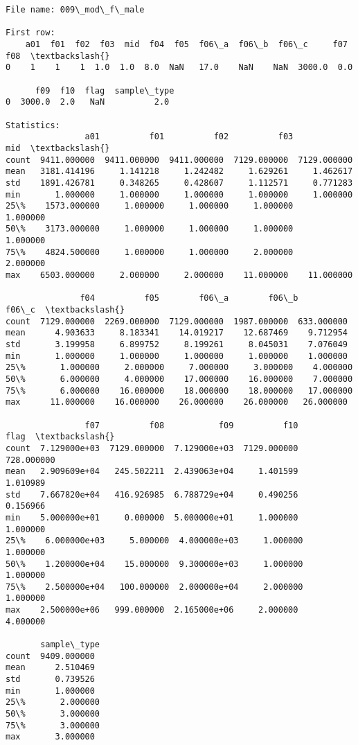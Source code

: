 \documentclass[11pt]{article}
\begin{document}
\begin{Verbatim}[commandchars=\\\{\}]
File name: 009\_mod\_f\_male

First row: 
    a01  f01  f02  f03  mid  f04  f05  f06\_a  f06\_b  f06\_c     f07  f08  \textbackslash{}
0    1    1    1  1.0  1.0  8.0  NaN   17.0    NaN    NaN  3000.0  0.0   

      f09  f10  flag  sample\_type  
0  3000.0  2.0   NaN          2.0  

Statistics: 
                a01          f01          f02          f03          mid  \textbackslash{}
count  9411.000000  9411.000000  9411.000000  7129.000000  7129.000000   
mean   3181.414196     1.141218     1.242482     1.629261     1.462617   
std    1891.426781     0.348265     0.428607     1.112571     0.771283   
min       1.000000     1.000000     1.000000     1.000000     1.000000   
25\%    1573.000000     1.000000     1.000000     1.000000     1.000000   
50\%    3173.000000     1.000000     1.000000     1.000000     1.000000   
75\%    4824.500000     1.000000     1.000000     2.000000     2.000000   
max    6503.000000     2.000000     2.000000    11.000000    11.000000   

               f04          f05        f06\_a        f06\_b       f06\_c  \textbackslash{}
count  7129.000000  2269.000000  7129.000000  1987.000000  633.000000   
mean      4.903633     8.183341    14.019217    12.687469    9.712954   
std       3.199958     6.899752     8.199261     8.045031    7.076049   
min       1.000000     1.000000     1.000000     1.000000    1.000000   
25\%       1.000000     2.000000     7.000000     3.000000    4.000000   
50\%       6.000000     4.000000    17.000000    16.000000    7.000000   
75\%       6.000000    16.000000    18.000000    18.000000   17.000000   
max      11.000000    16.000000    26.000000    26.000000   26.000000   

                f07          f08           f09          f10        flag  \textbackslash{}
count  7.129000e+03  7129.000000  7.129000e+03  7129.000000  728.000000   
mean   2.909609e+04   245.502211  2.439063e+04     1.401599    1.010989   
std    7.667820e+04   416.926985  6.788729e+04     0.490256    0.156966   
min    5.000000e+01     0.000000  5.000000e+01     1.000000    1.000000   
25\%    6.000000e+03     5.000000  4.000000e+03     1.000000    1.000000   
50\%    1.200000e+04    15.000000  9.300000e+03     1.000000    1.000000   
75\%    2.500000e+04   100.000000  2.000000e+04     2.000000    1.000000   
max    2.500000e+06   999.000000  2.165000e+06     2.000000    4.000000   

       sample\_type  
count  9409.000000  
mean      2.510469  
std       0.739526  
min       1.000000  
25\%       2.000000  
50\%       3.000000  
75\%       3.000000  
max       3.000000  


\end{Verbatim}
\end{document}

